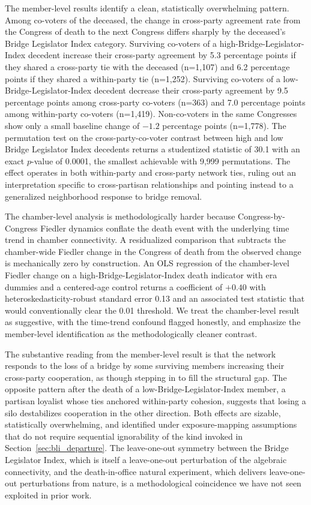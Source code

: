 \documentclass[12pt, a4paper]{article}
\begin{document}
The member-level results identify a clean, statistically overwhelming pattern. Among co-voters of the deceased, the change in cross-party agreement rate from the Congress of death to the next Congress differs sharply by the deceased's Bridge Legislator Index category. Surviving co-voters of a high-Bridge-Legislator-Index decedent increase their cross-party agreement by 5.3 percentage points if they shared a cross-party tie with the deceased (n=1{,}107) and 6.2 percentage points if they shared a within-party tie (n=1{,}252). Surviving co-voters of a low-Bridge-Legislator-Index decedent decrease their cross-party agreement by 9.5 percentage points among cross-party co-voters (n=363) and 7.0 percentage points among within-party co-voters (n=1{,}419). Non-co-voters in the same Congresses show only a small baseline change of $-1.2$ percentage points (n=1{,}778). The permutation test on the cross-party-co-voter contrast between high and low Bridge Legislator Index decedents returns a studentized statistic of 30.1 with an exact $p$-value of 0.0001, the smallest achievable with 9{,}999 permutations. The effect operates in both within-party and cross-party network ties, ruling out an interpretation specific to cross-partisan relationships and pointing instead to a generalized neighborhood response to bridge removal.

The chamber-level analysis is methodologically harder because Congress-by-Congress Fiedler dynamics conflate the death event with the underlying time trend in chamber connectivity. A residualized comparison that subtracts the chamber-wide Fiedler change in the Congress of death from the observed change is mechanically zero by construction. An OLS regression of the chamber-level Fiedler change on a high-Bridge-Legislator-Index death indicator with era dummies and a centered-age control returns a coefficient of $+0.40$ with heteroskedasticity-robust standard error 0.13 and an associated test statistic that would conventionally clear the 0.01 threshold. We treat the chamber-level result as suggestive, with the time-trend confound flagged honestly, and emphasize the member-level identification as the methodologically cleaner contrast.

The substantive reading from the member-level result is that the network responds to the loss of a bridge by some surviving members increasing their cross-party cooperation, as though stepping in to fill the structural gap. The opposite pattern after the death of a low-Bridge-Legislator-Index member, a partisan loyalist whose ties anchored within-party cohesion, suggests that losing a silo destabilizes cooperation in the other direction. Both effects are sizable, statistically overwhelming, and identified under exposure-mapping assumptions that do not require sequential ignorability of the kind invoked in Section~\ref{sec:bli_departure}. The leave-one-out symmetry between the Bridge Legislator Index, which is itself a leave-one-out perturbation of the algebraic connectivity, and the death-in-office natural experiment, which delivers leave-one-out perturbations from nature, is a methodological coincidence we have not seen exploited in prior work.
\end{document}
